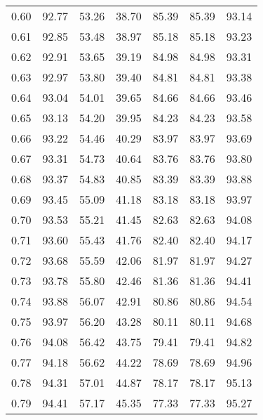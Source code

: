 \begin{tabular}{|c|c|c|c|c|c|c|}
      0.60 &     92.77 &     53.26 &      38.70 &   85.39 &      85.39 &         93.14 \\
      0.61 &     92.85 &     53.48 &      38.97 &   85.18 &      85.18 &         93.23 \\
      0.62 &     92.91 &     53.65 &      39.19 &   84.98 &      84.98 &         93.31 \\
      0.63 &     92.97 &     53.80 &      39.40 &   84.81 &      84.81 &         93.38 \\
      0.64 &     93.04 &     54.01 &      39.65 &   84.66 &      84.66 &         93.46 \\
      0.65 &     93.13 &     54.20 &      39.95 &   84.23 &      84.23 &         93.58 \\
      0.66 &     93.22 &     54.46 &      40.29 &   83.97 &      83.97 &         93.69 \\
      0.67 &     93.31 &     54.73 &      40.64 &   83.76 &      83.76 &         93.80 \\
      0.68 &     93.37 &     54.83 &      40.85 &   83.39 &      83.39 &         93.88 \\
      0.69 &     93.45 &     55.09 &      41.18 &   83.18 &      83.18 &         93.97 \\
      0.70 &     93.53 &     55.21 &      41.45 &   82.63 &      82.63 &         94.08 \\
      0.71 &     93.60 &     55.43 &      41.76 &   82.40 &      82.40 &         94.17 \\
      0.72 &     93.68 &     55.59 &      42.06 &   81.97 &      81.97 &         94.27 \\
      0.73 &     93.78 &     55.80 &      42.46 &   81.36 &      81.36 &         94.41 \\
      0.74 &     93.88 &     56.07 &      42.91 &   80.86 &      80.86 &         94.54 \\
      0.75 &     93.97 &     56.20 &      43.28 &   80.11 &      80.11 &         94.68 \\
      0.76 &     94.08 &     56.42 &      43.75 &   79.41 &      79.41 &         94.82 \\
      0.77 &     94.18 &     56.62 &      44.22 &   78.69 &      78.69 &         94.96 \\
      0.78 &     94.31 &     57.01 &      44.87 &   78.17 &      78.17 &         95.13 \\
      0.79 &     94.41 &     57.17 &      45.35 &   77.33 &      77.33 &         95.27 \\

\end{tabular}

